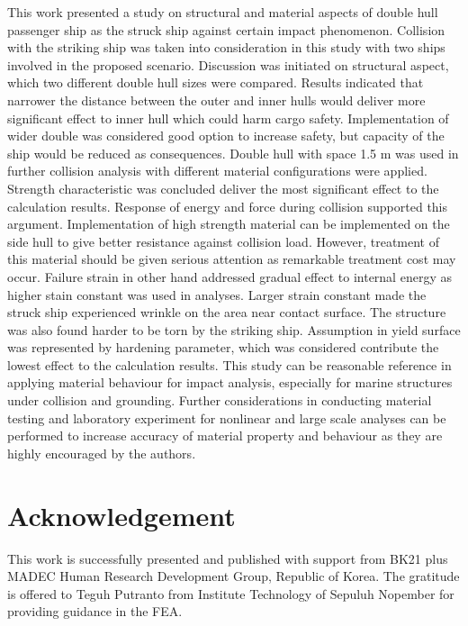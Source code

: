 \documentclass[10pt,journal]{IEEEtran}
\begin{document}
This work presented a study on structural and material aspects of double hull passenger ship as the struck ship against certain impact phenomenon. 
Collision with the striking ship was taken into consideration in this study with two ships involved in the proposed scenario. Discussion was initiated on structural aspect, which two different double hull sizes were compared. 
Results indicated that narrower the distance between the outer and inner hulls would deliver more significant effect to inner hull which could harm cargo safety. 
Implementation of wider double was considered good option to increase safety, but capacity of the ship would be reduced as consequences. 
Double hull with space 1.5 m was used in further collision analysis with different material configurations were applied. Strength characteristic was concluded deliver the most significant effect to the calculation results. 
Response of energy and force during collision supported this argument. Implementation of high strength material can be implemented on the side hull to give better resistance against collision load. 
However, treatment of this material should be given serious attention as remarkable treatment cost may occur. Failure strain in other hand addressed gradual effect to internal energy as higher stain constant was used in analyses. 
Larger strain constant made the struck ship experienced wrinkle on the area near contact surface. The structure was also found harder to be torn by the striking ship. 
Assumption in yield surface was represented by hardening parameter, which was considered contribute the lowest effect to the calculation results. 
This study can be reasonable reference in applying material behaviour for impact analysis, especially for marine structures under collision and grounding. 
Further considerations in conducting material testing and laboratory experiment for nonlinear and large scale analyses can be performed to increase accuracy of material property and behaviour as they are highly encouraged by the authors. 

\section*{Acknowledgement} 

This work is successfully presented and published with support from BK21 plus MADEC Human Research Development Group, Republic of Korea. 
The gratitude is offered to Teguh Putranto from Institute Technology of Sepuluh Nopember for providing guidance in the FEA. 




\end{document}
